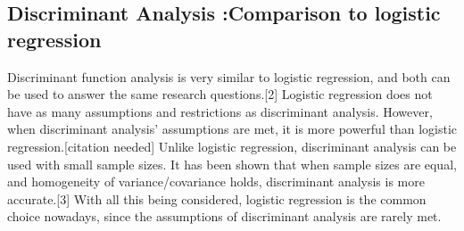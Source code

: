 \subsection{Discriminant Analysis :Comparison to logistic regression}

Discriminant function analysis is very similar to logistic regression, and both can be used to answer the same research questions.[2] Logistic regression does not have as many assumptions and restrictions as discriminant analysis. However, when discriminant analysis’ assumptions are met, it is more powerful than logistic regression.[citation needed] Unlike logistic regression, discriminant analysis can be used with small sample sizes. It has been shown that when sample sizes are equal, and homogeneity of variance/covariance holds, discriminant analysis is more accurate.[3] With all this being considered, logistic regression is 
the common choice nowadays, since the assumptions of discriminant analysis are rarely met.
